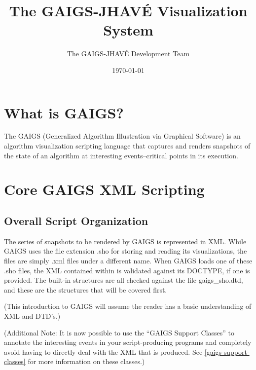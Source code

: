 \documentclass[11pt,letterpaper]{book}
\title{The GAIGS-JHAV\'{E} Visualization System}
\author{The GAIGS-JHAV\'{E} Development Team}
\date{\today}
\begin{document}
\maketitle

\tableofcontents

\chapter{What is GAIGS?}

The GAIGS (Generalized Algorithm Illustration via Graphical Software)
is an algorithm visualization scripting language that captures and
renders snapshots of the state of an algorithm at interesting
events--critical points in its execution.


\chapter{Core GAIGS XML Scripting}
\section{Overall Script Organization}



The series of snapshots to be rendered by GAIGS is represented in XML.
While GAIGS uses the file extension .sho for storing and reading its
visualizations, the files are simply .xml files under a different
name. When GAIGS loads one of these .sho files, the XML contained
within is validated against its DOCTYPE, if one is provided. The
built-in structures are all checked against the file gaigs\_sho.dtd,
and these are the structures that will be covered first.

(This introduction to GAIGS will assume the reader has a basic
understanding of XML and DTD's.)

(Additional Note: It is now possible to use the ``GAIGS Support
Classes'' to annotate the interesting events in your script-producing
programs and completely avoid having to directly deal with the XML that is
produced.  See \ref{gaigs-support-classes} for more information on these classes.)

\end{document}
